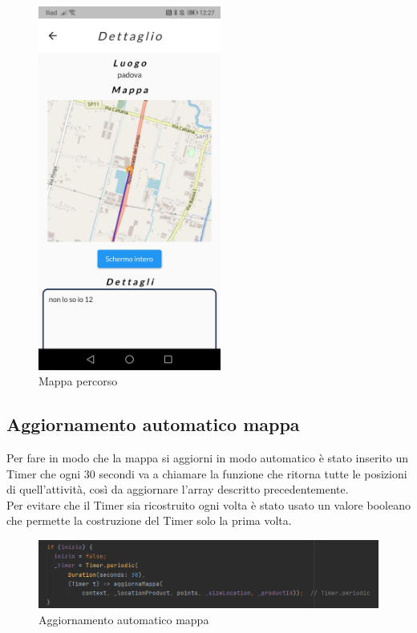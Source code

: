 \begin{figure}[htbp]	
	\centering
	\includegraphics[width=6cm]{immagini/mappa.jpeg}
	\caption{Mappa percorso}
	\label{fig:Mappa percorso}
\end{figure}

\newpage

\subsection{Aggiornamento automatico mappa}
Per fare in modo che la mappa si aggiorni in modo automatico è stato inserito un Timer che ogni 30 secondi va a chiamare la funzione che ritorna tutte le posizioni di quell'attività, così da aggiornare l'array descritto precedentemente.\\
Per evitare che il Timer sia ricostruito ogni volta è stato usato un valore booleano che permette la costruzione del Timer solo la prima volta.\\

\begin{figure}[htbp]	
	\centering
	\includegraphics[width=14cm]{immagini/automatico.png}
	\caption{Aggiornamento automatico mappa}
	\label{fig:Aggiornamento automatico mappa}
\end{figure}

